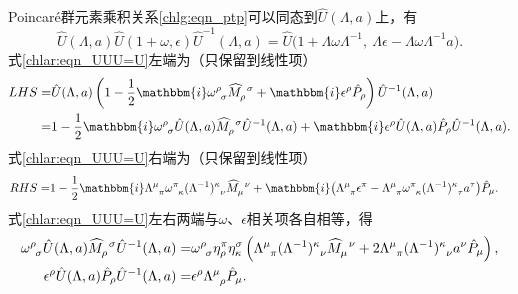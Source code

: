 Poincar\'e群元素乘积关系\eqref{chlg:eqn_ptp}可以同态到$\hat{U}(\Lambda,a)$上，有
\begin{equation}\label{chlar:eqn_UUU=U}
	\hat{U}(\Lambda,a)\hat{U}(1+\omega,\epsilon)\hat{U}^{-1}(\Lambda,a)
	=\hat{U}\bigl(1+\Lambda\omega\Lambda^{-1},\  \Lambda\epsilon -\Lambda\omega\Lambda^{-1}a \bigr).
\end{equation}
式\eqref{chlar:eqn_UUU=U}左端为（只保留到线性项）
\begin{align*}
	LHS=&\hat{U}(\Lambda,a)\left(1-\frac{1}{2}\mathbbm{i} \omega^{\rho}_{\hphantom{\rho}\sigma} 
	\widehat{M}^{\hphantom{\rho}\sigma}_{\rho}
	+\mathbbm{i}\epsilon^{\rho}\hat{P}_{\rho} \right)\hat{U}^{-1}(\Lambda,a) \\
	=&1-\frac{1}{2}\mathbbm{i}  \omega^{\rho}_{\hphantom{\rho}\sigma}  \hat{U}(\Lambda,a)
	\widehat{M}^{\hphantom{\rho}\sigma}_{\rho} \hat{U}^{-1}(\Lambda,a) 
	+\mathbbm{i}\epsilon^{\rho}\hat{U}(\Lambda,a)\hat{P}_{\rho}\hat{U}^{-1}(\Lambda,a) .
\end{align*}
式\eqref{chlar:eqn_UUU=U}右端为（只保留到线性项）
\begin{align*}
	RHS=&1 -\frac{1}{2}\mathbbm{i}  \Lambda^{\mu}_{\hphantom{\mu}\pi} 
	\omega^\pi_{\hphantom{\pi} \kappa} (\Lambda^{-1})^\kappa_{\hphantom{\pi}\nu} 
	\widehat{M}^{\hphantom{\mu}\nu}_{\mu}
	+\mathbbm{i}\bigl(\Lambda^{\mu}_{\hphantom{\mu}\pi} \epsilon^\pi
	- \Lambda^{\mu}_{\hphantom{\mu}\pi} \omega^\pi_{\hphantom{\pi} \kappa} 
	(\Lambda^{-1})^\kappa_{\hphantom{\pi}\tau} a^\tau \bigr) \hat{P}_{\mu} .
\end{align*}
式\eqref{chlar:eqn_UUU=U}左右两端与$\omega$、$\epsilon$相关项各自相等，得
\begin{align*}
	\omega^{\rho}_{\hphantom{\rho}\sigma}  \hat{U}(\Lambda,a)
	\widehat{M}^{\hphantom{\rho}\sigma}_{\rho} \hat{U}^{-1}(\Lambda,a) =&
	\omega^\rho_{\hphantom{\rho} \sigma} \eta^\pi_\rho \eta_\kappa^\sigma \left(
	\Lambda^{\mu}_{\hphantom{\mu}\pi}  (\Lambda^{-1})^\kappa_{\hphantom{\pi}\nu} 
	\widehat{M}^{\hphantom{\mu}\nu}_{\mu}+ 2 \Lambda^{\mu}_{\hphantom{\mu}\pi}  
	(\Lambda^{-1})^\kappa_{\hphantom{\pi}\nu} a^\nu  \hat{P}_{\mu}     \right), \\
	\epsilon^{\rho}\hat{U}(\Lambda,a)\hat{P}_{\rho}\hat{U}^{-1}(\Lambda,a) =&
	\epsilon^\rho \Lambda^{\mu}_{\hphantom{\mu}\rho}  \hat{P}_{\mu} .
\end{align*}
